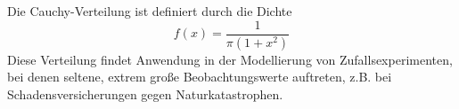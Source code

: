 \documentclass{abgabe}
\begin{document}
\begin{questions}
    \question
    Die Cauchy-Verteilung ist definiert durch die Dichte
    \[ 
        f(x) = \frac{1}{\pi(1 + x^2)}
    \]
    Diese Verteilung findet Anwendung in der Modellierung von Zufallsexperimenten, bei denen seltene, extrem große Beobachtungswerte auftreten, z.B. bei Schadensversicherungen gegen Naturkatastrophen.
\end{questions}
\end{document}
